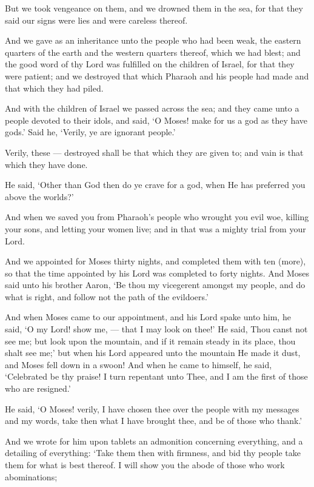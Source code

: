 \documentclass[fontsize=14pt, letterpaper, notitlepage, openany, DIV=12]{scrbook} %
\begin{document}
\noindent[7:136]
But we took vengeance on them, and we drowned them in the sea, for that they said our
signs were lies and were careless thereof.

\noindent[7:137]
And we gave as an inheritance unto the people who had been weak, the eastern quarters
of the earth and the western quarters thereof, which we had blest; and the good word of thy Lord
was fulfilled on the children of Israel, for that they were patient; and we destroyed that which
Pharaoh and his people had made and that which they had piled.

\noindent[7:138]
And with the children of Israel we passed across the sea; and they came unto a people
devoted to their idols, and said, `O Moses! make for us a god as they have gods.' Said he,
`Verily, ye are ignorant people.'

\noindent[7:139]
Verily, these --- destroyed shall be that which they are given to; and vain is that which
they have done.

\noindent[7:140]
He said, `Other than God then do ye crave for a god, when He has preferred you above
the worlds?'

\noindent[7:141]
And when we saved you from Pharaoh's people who wrought you evil woe, killing your
sons, and letting your women live; and in that was a mighty trial from your Lord.

\noindent[7:142]
And we appointed for Moses thirty nights, and completed them with ten (more), so that
the time appointed by his Lord was completed to forty nights. And Moses said unto his brother
Aaron, `Be thou my vicegerent amongst my people, and do what is right, and follow not the path
of the evildoers.'

\noindent[7:143]
And when Moses came to our appointment, and his Lord spake unto him, he said, `O my
Lord! show me, --- that I may look on thee!' He said, Thou canst not see me; but look upon the
mountain, and if it remain steady in its place, thou shalt see me;' but when his Lord appeared
unto the mountain He made it dust, and Moses fell down in a swoon! And when he came to
himself, he said, `Celebrated be thy praise! I turn repentant unto Thee, and I am the first of those
who are resigned.'

\noindent[7:144]
He said, `O Moses! verily, I have chosen thee over the people with my messages and my
words, take then what I have brought thee, and be of those who thank.'

\noindent[7:145]
And we wrote for him upon tablets an admonition concerning everything, and a detailing
of everything: `Take them then with firmness, and bid thy people take them for what is best
thereof. I will show you the abode of those who work abominations;
\end{document}
